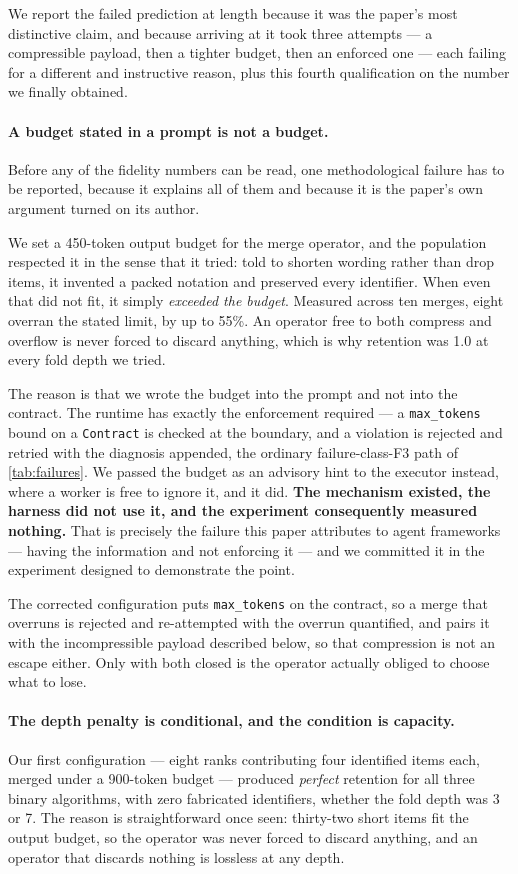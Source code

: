 \documentclass[10pt,twocolumn]{article}
\theoremstyle{definition}
\theoremstyle{plain}
\newcommand{\code}[1]{\texttt{\small #1}}
\begin{document}
We report the failed prediction at length because it was the paper's most distinctive
claim, and because arriving at it took three attempts --- a compressible payload, then a
tighter budget, then an enforced one --- each failing for a different and instructive
reason, plus this fourth qualification on the number we finally obtained.

\paragraph{A budget stated in a prompt is not a budget.} Before any of the fidelity
numbers can be read, one methodological failure has to be reported, because it explains
all of them and because it is the paper's own argument turned on its author.

We set a 450-token output budget for the merge operator, and the population respected
it in the sense that it tried: told to shorten wording rather than drop items, it
invented a packed notation and preserved every identifier. When even that did not fit,
it simply \emph{exceeded the budget}. Measured across ten merges, eight overran the
stated limit, by up to 55\%. An operator free to both compress and overflow is never
forced to discard anything, which is why retention was 1.0 at every fold depth we
tried.

The reason is that we wrote the budget into the prompt and not into the contract. The
runtime has exactly the enforcement required --- a \code{max\_tokens} bound on a
\code{Contract} is checked at the boundary, and a violation is rejected and retried with
the diagnosis appended, the ordinary failure-class-F3 path of
\cref{tab:failures}. We passed the budget as an advisory hint to the executor instead,
where a worker is free to ignore it, and it did. \textbf{The mechanism existed, the
harness did not use it, and the experiment consequently measured nothing.} That is
precisely the failure this paper attributes to agent frameworks --- having the
information and not enforcing it --- and we committed it in the experiment designed to
demonstrate the point.

The corrected configuration puts \code{max\_tokens} on the contract, so a merge that
overruns is rejected and re-attempted with the overrun quantified, and pairs it with the
incompressible payload described below, so that compression is not an escape either. Only
with both closed is the operator actually obliged to choose what to lose.

\paragraph{The depth penalty is conditional, and the condition is capacity.} Our
first configuration --- eight ranks contributing four identified items each, merged
under a 900-token budget --- produced \emph{perfect} retention for all three binary
algorithms, with zero fabricated identifiers, whether the fold depth was 3 or 7. The
reason is straightforward once seen: thirty-two short items fit the output budget, so
the operator was never forced to discard anything, and an operator that discards
nothing is lossless at any depth.
\end{document}

